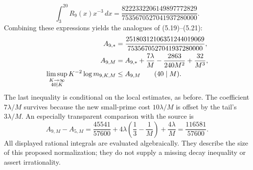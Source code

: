 \begin{equation}
 \int_3^{20}R_9(x)x^{-3}\,dx
 =\frac{8222332206149897772829}{7535670527041937280000}.
 \label{s5-finite-inner}
\end{equation}
Combining these expressions yields the analogues of (5.19)--(5.21):
\begin{align}
 A_{9,*}&=\frac{25180312106351244019069}{7535670527041937280000},
 \notag\\
 A_{9,M}&=A_{9,*}+\frac{7\lambda}{M}
             -\frac{2863}{240M^2}+\frac{32}{M^3},
 \label{s5-final-A}\\
 \limsup_{\substack{K\to\infty\\40\mid K}}
 K^{-2}\log m_{9,K,M}&\leq A_{9,M}\qquad(40\mid M).
 \notag
\end{align}
The last inequality is conditional on the local estimates, as before.
The coefficient $7\lambda/M$ survives because the new small-prime cost
$10\lambda/M$ is offset by the tail's $3\lambda/M$.
An especially transparent comparison with the source is
\begin{equation}
 A_{9,M}-A_{5,M}
 =\frac{45541}{57600}
    +4\lambda\left(\frac13-\frac1M\right)+\frac{4\lambda}{M}
 =\frac{116581}{57600}.
 \label{s5-budget-increment}
\end{equation}
All displayed rational integrals are evaluated algebraically.  They
describe the size of this proposed normalization; they do not supply a
missing decay inequality or assert irrationality.
